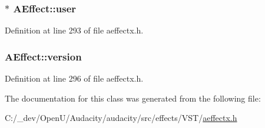 \subsubsection[{\texorpdfstring{user}{user}}]{$\ast$ A\+Effect\+::user}\hypertarget{class_a_effect_aee5789fd3f0301cbfc91c97760291783}{}\label{class_a_effect_aee5789fd3f0301cbfc91c97760291783}


Definition at line 293 of file aeffectx.\+h.

\subsubsection[{\texorpdfstring{version}{version}}]{ A\+Effect\+::version}\hypertarget{class_a_effect_a15e8ddd47fc0c051f4b57a79c97b48f1}{}\label{class_a_effect_a15e8ddd47fc0c051f4b57a79c97b48f1}


Definition at line 296 of file aeffectx.\+h.



The documentation for this class was generated from the following file\+:\begin{DoxyCompactItemize}
\item 
C\+:/\+\_\+dev/\+Open\+U/\+Audacity/audacity/src/effects/\+V\+S\+T/\hyperlink{aeffectx_8h}{aeffectx.\+h}\end{DoxyCompactItemize}
